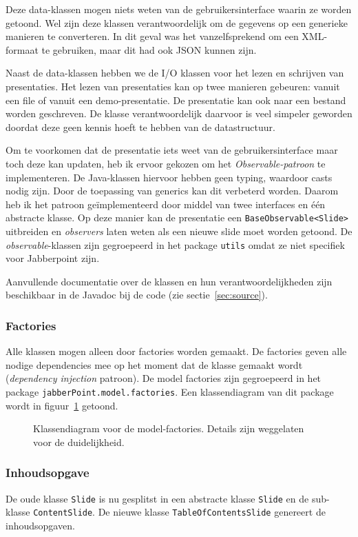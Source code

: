 \documentclass[a4paper]{article}
\newcommand{\code}[1]{\lstinline[columns=fixed]{#1}}
\newcommand{\diagram}[3][1.3]{
	\begin{figure}[!htb]
	 \caption{#3}
	 \label{diagram:#2}
	 \makebox[\textwidth][c]{\texttt{[image: Diagrams/\#2.pdf]}}%
	\end{figure}
}
\begin{document}
		Deze data-klassen mogen niets weten van de gebruikersinterface waarin ze worden getoond.
		Wel zijn deze klassen verantwoordelijk om de gegevens op een generieke manieren te converteren.
		In dit geval was het vanzelfsprekend om een XML-formaat te gebruiken, maar dit had ook JSON kunnen zijn.

		Naast de data-klassen hebben we de I/O klassen voor het lezen en schrijven van presentaties.
		Het lezen van presentaties kan op twee manieren gebeuren: vanuit een file of vanuit een demo-presentatie.
		De presentatie kan ook naar een bestand worden geschreven.
		De klasse verantwoordelijk daarvoor is veel simpeler geworden doordat deze geen kennis hoeft te hebben van de datastructuur.

		Om te voorkomen dat de presentatie iets weet van de gebruikersinterface maar toch deze kan updaten, heb ik ervoor gekozen om het \textit{Observable-patroon} te implementeren.
		De Java-klassen hiervoor hebben geen typing, waardoor casts nodig zijn.
		Door de toepassing van generics kan dit verbeterd worden.
		Daarom heb ik het patroon geïmplementeerd door middel van twee interfaces en één abstracte klasse.
		Op deze manier kan de presentatie een \code{BaseObservable<Slide>} uitbreiden en \textit{observers} laten weten als een nieuwe slide moet worden getoond.
		De \textit{observable}-klassen zijn gegroepeerd in het package \code{utils} omdat ze niet specifiek voor Jabberpoint zijn.

		Aanvullende documentatie over de klassen en hun verantwoordelijkheden zijn beschikbaar in de Javadoc bij de code (zie sectie~\ref{sec:source}).
		
		\subsubsection{Factories}\label{sec:model-factories}
			Alle klassen mogen alleen door factories worden gemaakt.
			De factories geven alle nodige dependencies mee op het moment dat de klasse gemaakt wordt (\textit{dependency injection} patroon).
			De model factories zijn gegroepeerd in het package \code{jabberPoint.model.factories}.
			Een klassendiagram van dit package wordt in figuur~\ref{diagram:model-factories} getoond.

			\diagram{model-factories}{
				Klassendiagram voor de model-factories.
				Details zijn weggelaten voor de duidelijkheid.
			}

		\subsubsection{Inhoudsopgave}
			De oude klasse \code{Slide} is nu gesplitst in een abstracte klasse \code{Slide} en de sub-klasse \code{ContentSlide}.
			De nieuwe klasse \code{TableOfContentsSlide} genereert de inhoudsopgaven.
\end{document}
